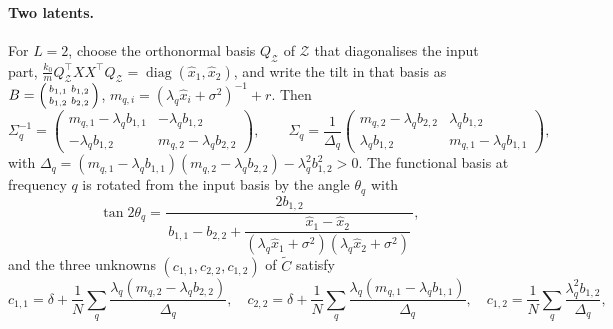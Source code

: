 \documentclass[11pt,a4paper]{article}
\newcommand{\diag}{\operatorname{diag}}
\newcommand{\Ct}{\tilde C}
\newcommand{\Z}{\mathcal Z}
\begin{document}
\paragraph{Two latents.}
For $L = 2$, choose the orthonormal basis $Q_\Z$ of $\Z$ that diagonalises the input part, $\frac{k_0}{m}Q_\Z^\top XX^\top Q_\Z = \diag(\hat x_1, \hat x_2)$, and write the tilt in that basis as $B = \begin{psmallmatrix} b_{1,1} & b_{1,2}\\ b_{1,2} & b_{2,2}\end{psmallmatrix}$, $m_{q,i} = (\lambda_q\hat x_i + \sigma^2)^{-1} + r$. Then
\begin{equation}
  \Sigma_q^{-1} = \begin{pmatrix} m_{q,1} - \lambda_q b_{1,1} & -\lambda_q b_{1,2} \\ -\lambda_q b_{1,2} & m_{q,2} - \lambda_q b_{2,2}\end{pmatrix},
  \qquad
  \Sigma_q = \frac1{\Delta_q}\begin{pmatrix} m_{q,2} - \lambda_q b_{2,2} & \lambda_q b_{1,2} \\ \lambda_q b_{1,2} & m_{q,1} - \lambda_q b_{1,1}\end{pmatrix},
\end{equation}
with $\Delta_q = (m_{q,1}-\lambda_q b_{1,1})(m_{q,2}-\lambda_q b_{2,2}) - \lambda_q^2 b_{1,2}^2 > 0$. The functional basis at frequency $q$ is rotated from the input basis by the angle $\theta_q$ with
\begin{equation}
  \tan 2\theta_q = \frac{2 b_{1,2}}{\,b_{1,1} - b_{2,2} + \dfrac{\hat x_1 - \hat x_2}{(\lambda_q\hat x_1 + \sigma^2)(\lambda_q\hat x_2 + \sigma^2)}\,},
  \label{eq:two-latent-angle}
\end{equation}
and the three unknowns $(c_{1,1}, c_{2,2}, c_{1,2})$ of $\Ct$ satisfy
\begin{equation}
  c_{1,1} = \delta + \frac1N\sum_q\frac{\lambda_q(m_{q,2}-\lambda_q b_{2,2})}{\Delta_q},\quad
  c_{2,2} = \delta + \frac1N\sum_q\frac{\lambda_q(m_{q,1}-\lambda_q b_{1,1})}{\Delta_q},\quad
  c_{1,2} = \frac1N\sum_q\frac{\lambda_q^2 b_{1,2}}{\Delta_q},
  \label{eq:two-latent-system}
\end{equation}
\end{document}
